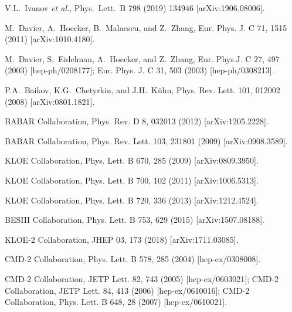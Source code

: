 \begin{thebibliography}{99}
  V.L.~Ivanov {\it et al.},
  Phys.\ Lett.\ B 798 (2019) 134946 [arXiv:1906.08006].

        M.~Davier, A.~Hoecker, B.~Malaescu, and Z.~Zhang,
                              Eur. Phys. J. C 71, 1515 (2011) [arXiv:1010.4180].

        M.~Davier, S.~Eidelman, A.~Hoecker, and Z.~Zhang,
                              Eur. Phys.J. C 27, 497 (2003) [hep-ph/0208177];
                              Eur. Phys. J. C 31, 503 (2003) [hep-ph/0308213]. 

          P.A.~Baikov, K.G.~Chetyrkin, and J.H.~K\"uhn,
                              Phys. Rev. Lett. 101, 012002 (2008) [arXiv:0801.1821]. 
                              
      BABAR Collaboration, Phys. Rev. D 8, 032013 (2012) [arXiv:1205.2228].

      BABAR Collaboration, Phys. Rev. Lett. 103, 231801 (2009) [arXiv:0908.3589].

          KLOE Collaboration, Phys. Lett. B 670, 285 (2009) [arXiv:0809.3950].

          KLOE Collaboration, Phys. Lett. B 700, 102 (2011) [arXiv:1006.5313].

          KLOE Collaboration, Phys. Lett. B 720, 336 (2013) [arXiv:1212.4524].

         BESIII Collaboration, Phys. Lett. B 753, 629 (2015) [arXiv:1507.08188].

  KLOE-2 Collaboration,
  JHEP 03, 173 (2018)
  [arXiv:1711.03085].

          CMD-2 Collaboration, Phys. Lett. B 578, 285 (2004) [hep-ex/0308008].

         CMD-2 Collaboration, JETP Lett. 82, 743 (2005) [hep-ex/0603021]; 
                          CMD-2 Collaboration, JETP Lett. 84, 413 (2006) [hep-ex/0610016];
                          CMD-2 Collaboration, Phys. Lett. B 648, 28 (2007) [hep-ex/0610021].


\end{thebibliography}
